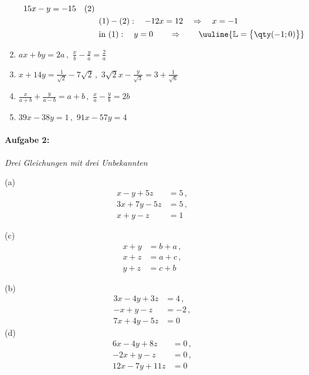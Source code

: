 \begin{enumerate}[label=(\alph*)]
\begin{align*}
\begin{array}{l}
            15x -y = -15 \quad (2)
        \end{array} \\
        &(1) - (2): \quad -12x = 12 \quad \Rightarrow \quad  x = -1\\
        &\text{in } (1): \quad y = 0 \qquad \Rightarrow \qquad \uuline{\mathbb{L} = \big\{\qty(-1;0)\big\}}
    \end{align*}
    \item $ax+by=2a\,, $ \tab $ \frac{x}{b}-\frac{y}{a}=\frac{2}{a}$
    \item $x+14y=\frac{1}{\sqrt{2}}-7\sqrt{2}\,, $ \tab $ 3\sqrt{2}x-\frac{y}{\sqrt{3}}=3+\frac{1}{\sqrt{6}}$
    \item $\frac{x}{a+b}+\frac{y}{a-b}=a+b\,, $ \tab $ \frac{x}{a}-\frac{y}{b}=2b$
    \item $39x-38y=1\,, $ \tab $ 91x-57y=4$
\end{enumerate}

\paragraph{Aufgabe 2: } \emph{Drei Gleichungen mit drei Unbekannten}\\[0.2cm]
%
\begin{center}
\begin{minipage}[t]{0.3\linewidth}
(a)\vspace{-2.7em}
\begin{align*}
    x-y+5z&=5\,,\\
    3x+7y-5z&=5\,,\\
    x+y-z&=1
\end{align*}

(c)\vspace{-2.7em}
\begin{align*}
    x+y&=b+a\,,\\
    x+z&=a+c\,,\\
    y+z&=c+b
\end{align*}
\end{minipage} \hspace{1.5cm}
\begin{minipage}[t]{0.4\linewidth}
%
(b)\vspace{-2.7em}
\begin{align*}
    3x-4y+3z&=4\,,\\
    -x+y-z&=-2\,,\\
    7x+4y-5z&=0
\end{align*}
(d)\vspace{-2.7em}
\begin{align*}
    6x-4y+8z&=0\,, \\
    -2x+y-z&=0\,,\\
    12x-7y+11z&=0
\end{align*}
\end{minipage} \\[0.2cm]
\end{center}
\vspace{0.7cm}

